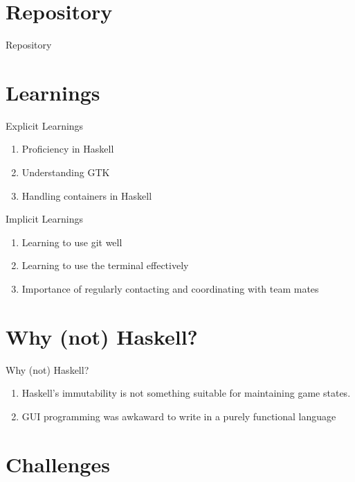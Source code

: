 \documentclass{beamer}
\begin{document}
\section{Repository}
\begin{frame}{Repository}
    \href{https://gitlab.com/minesweeper5623226/ducking-off}{}
\end{frame}

\section{Learnings}

\begin{frame}{Explicit Learnings}
    \begin{enumerate}
        \item Proficiency in Haskell
        \item Understanding GTK
        \item Handling containers in Haskell
    \end{enumerate}
\end{frame}

\begin{frame}{Implicit Learnings}
    \begin{enumerate}
        \item Learning to use git well
        \item Learning to use the terminal effectively
        \item Importance of regularly contacting and coordinating with team mates
    \end{enumerate}
\end{frame}

\section{Why (not) Haskell?}
\begin{frame}{Why (not) Haskell?}
    \begin{enumerate}
        \item Haskell's immutability is not something suitable for maintaining game states.
        \item GUI programming was awkaward to write in a purely functional language
    \end{enumerate}
\end{frame}

\section{Challenges}
\end{document}
